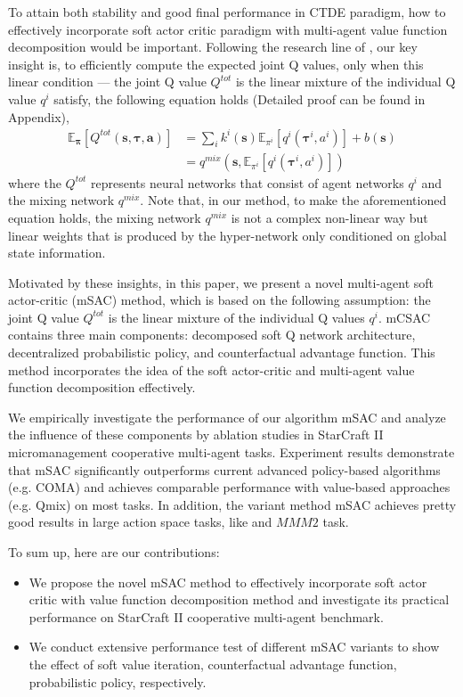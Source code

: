 \documentclass[runningheads]{llncs}
\begin{document}
To attain both stability and good final performance in CTDE paradigm, how to effectively incorporate soft actor critic paradigm with multi-agent value function decomposition would be important. Following the research line of \cite{b14}, our key insight is, to efficiently compute the expected joint Q values, only when this linear condition --- the joint Q value $Q^{tot}$ is the linear mixture of the individual Q value ${q^{i}}$ satisfy, the following equation holds (Detailed proof can be found in Appendix), 
\begin{align}
	\mathbb{E}_{\boldsymbol{\pi}}\left[Q^{t o t}(\boldsymbol{s},\boldsymbol{\tau}, \boldsymbol{a})\right]
	&=\sum_{i} k^{i}(\boldsymbol{s}) \mathbb{E}_{{\pi}^{i}} \left[ q^{i}\left(\boldsymbol{\tau}^{i}, a^{i}\right)\right]+ b(\boldsymbol{s})\\
	&=q^{mix}(\boldsymbol{s},\mathbb{E}_{{\pi}^{i}} \left[ q^{i}\left(\boldsymbol{\tau}^{i}, a^{i}\right)\right])
\end{align}
where the  $Q^{tot}$ represents neural networks that consist of agent networks  ${q^{i}}$ and the mixing network ${q^{mix}}$. Note that, in our method, to make the aforementioned equation holds, the mixing network ${q^{mix}}$ is not a complex non-linear way but linear weights that is produced by the hyper-network only conditioned on global state information. 


Motivated by these insights, in this paper, we present a novel multi-agent soft actor-critic (mSAC) method, which is based on the following assumption: the joint Q value $Q^{tot}$ is the linear mixture of the individual Q values ${q^{i}}$. mCSAC contains three main components: decomposed soft Q network architecture, decentralized probabilistic policy, and counterfactual advantage function. This method incorporates the idea of the soft actor-critic and multi-agent value function decomposition effectively.


We empirically investigate the performance of our algorithm mSAC and analyze the influence of these components by ablation studies in StarCraft II micromanagement cooperative multi-agent tasks. Experiment results demonstrate that mSAC significantly outperforms current advanced policy-based algorithms (e.g. COMA) and achieves comparable performance with value-based approaches (e.g. Qmix) on most tasks. In addition, the variant method mSAC achieves pretty good results in large action space tasks, like  and $MMM2$ task.


To sum up, here are our contributions: 
\begin{itemize}
	\item We propose the novel mSAC method to effectively incorporate soft actor critic with value function decomposition method and investigate its practical performance on StarCraft II cooperative multi-agent benchmark. 
	\item We conduct extensive performance test of different mSAC variants to show the effect of soft value iteration, counterfactual advantage function, probabilistic policy, respectively.
\end{itemize} 
\end{document}
